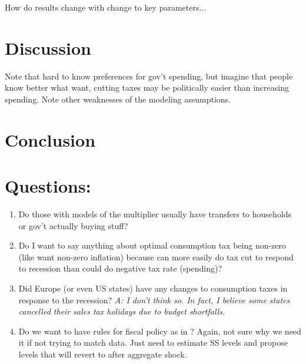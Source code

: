 \documentclass[article,11pt,letterpaper,fleqn]{article}
\theoremstyle{definition}
\numberwithin{equation}{section}
\newcommand{\cn}{\citeasnoun} %
\begin{document}
How do results change with change to key parameters...


\section{Discussion}

Note that hard to know preferences for gov't spending, but imagine that people know better what want, cutting taxes may be politically easier than increasing spending.  Note other weaknesses of the modeling assumptions.

\section{Conclusion}



\section{Questions:}
\begin{enumerate}
\item Do those with models of the multiplier usually have transfers to households or gov't actually buying stuff?
\item Do I want to say anything about optimal consumption tax being non-zero (like want non-zero inflation) because can more easily do tax cut to respond to recession than could do negative tax rate (spending)?
\item Did Europe (or even US states) have any changes to consumption taxes in response to the recession? \emph{A: I don't think so.  In fact, I believe some states cancelled their sales tax holidays due to budget shortfalls.}
\item Do we want to have rules for fiscal policy as in \cn{Zubairy2010}?  Again, not sure why we need it if not trying to match data.  Just need to estimate SS levels and propose levels that will revert to after aggregate shock.
\end{enumerate}
\end{document}
